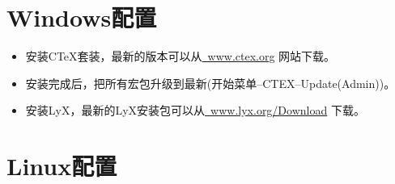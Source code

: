 \documentclass[twoside,longtitle]{LZUthesis}
\begin{document}
\section{Windows配置}
\begin{itemize}
\item 安装C\TeX{}套装，最新的版本可以从\href{http://www.ctex.org}{~www.ctex.org} 网站下载。
\item 安装完成后，把所有宏包升级到最新(开始菜单--CTEX--Update(Admin))。
\item 安装LyX，最新的LyX安装包可以从\href{http://www.lyx.org/Download}{~www.lyx.org/Download} 下载。
\end{itemize}

\section{Linux配置}
\end{document}
